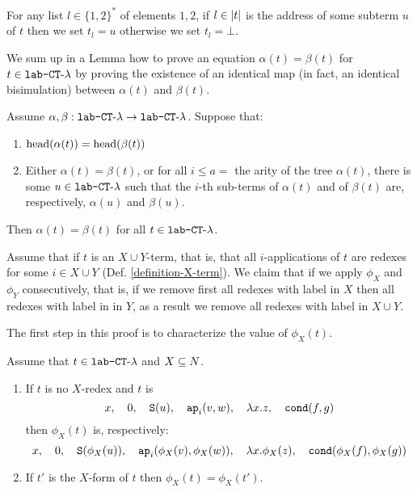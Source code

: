 



 For any list $l \in \{1,2\}^*$ of elements $1,2$, 
 if $l \in {|t|}$ is the address of some subterm $u$ of $t$ then we set $t_l = u$ 
 otherwise we set $t_l = \bot$. 

We sum up in a Lemma how to prove an equation $\alpha(t) = \beta(t)$ for $t \in {\mbox{\tt lab-} { {\tt CT}\mbox{-}\lambda} }$
by proving the existence of an identical map 
(in fact, an identical bisimulation) between $\alpha(t)$ and $\beta(t)$.

\begin{lemma}
\label{lemma-sufficient-condition}
Assume $\alpha, \beta: {\mbox{\tt lab-}{ {\tt CT}\mbox{-}\lambda}} \rightarrow {\mbox{\tt lab-} { {\tt CT}\mbox{-}\lambda} }$. 
Suppose that:

\begin{enumerate}
\item
${\rm head}(\alpha(t)) = {\rm head}(\beta(t))$ 
\item
Either $\alpha(t) = \beta(t)$, or 
for all $i\le a =$ the arity of the tree $\alpha(t)$,
there is some $u \in {\mbox{\tt lab-} { {\tt CT}\mbox{-}\lambda} }$ such that the $i$-th sub-terms of 
 $\alpha(t)$ and of $\beta(t)$ are, respectively, $\alpha(u)$ and $\beta(u)$.
\end{enumerate}

Then $\alpha(t) = \beta(t)$ for all $t \in {\mbox{\tt lab-} { {\tt CT}\mbox{-}\lambda} }$.
\end{lemma}

Assume that if $t$ is an $X \cup Y$-term,
that is, that all $i$-applications of $t$ are redexes for some $i \in X \cup Y$ (Def. \ref{definition-X-term}).
We claim that if we apply $\phi_X$ and $\phi_Y$ consecutively, 
that is, if we remove first all redexes with label in $X$ then all redexes with label in in $Y$, 
as a result we remove all redexes with label in $X \cup Y$.



The first step in this proof is to characterize the value of $\phi_X(t)$.

\begin{lemma}
Assume that $t \in {\mbox{\tt lab-} { {\tt CT}\mbox{-}\lambda} }$ and $X \subseteq {N}$.
\begin{enumerate}

\item
If $t$ is no $X$-redex and $t$ is
$$ 
x, \ \ \  
0, \ \ \  
{\tt S}(u),  \ \ \  
{\tt ap}_i(v,w), \ \ \  
\lambda x.z, \ \ \  
{\tt cond}(f,g)
$$
then $\phi_X(t)$ is, respectively:
$$ 
x, \ \ \  
0, \ \ \  
{\tt S}(\phi_X(u)),  \ \ \  
{\tt ap}_i(\phi_X(v),\phi_X(w)), \ \ \  
\lambda x.\phi_X(z), \ \ \  
{\tt cond}(\phi_X(f),\phi_X(g))
$$

\item
If $t'$ is the $X$-form of $t$ then $\phi_X(t) = \phi_X(t')$.

\end{enumerate}
\end{lemma}


